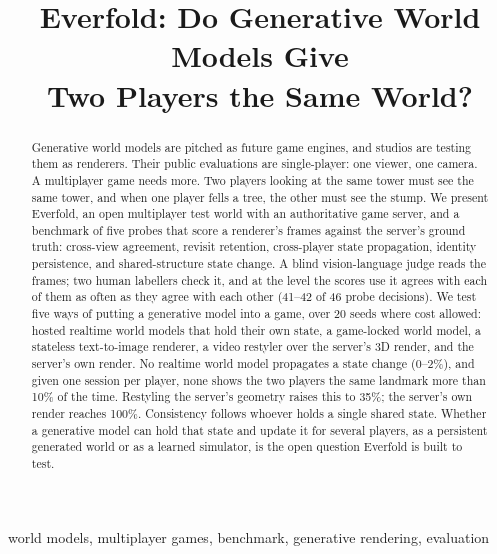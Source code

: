 \documentclass[conference]{IEEEtran}
\begin{document}
\title{Everfold: Do Generative World Models Give\\Two Players the Same World?}

\author{
}

\maketitle

\begin{abstract}
Generative world models are pitched as future game engines, and studios are testing them as renderers. Their public evaluations are single-player: one viewer, one camera. A multiplayer game needs more. Two players looking at the same tower must see the same tower, and when one player fells a tree, the other must see the stump. We present Everfold, an open multiplayer test world with an authoritative game server, and a benchmark of five probes that score a renderer's frames against the server's ground truth: cross-view agreement, revisit retention, cross-player state propagation, identity persistence, and shared-structure state change. A blind vision-language judge reads the frames; two human labellers check it, and at the level the scores use it agrees with each of them as often as they agree with each other (41--42 of 46 probe decisions). We test five ways of putting a generative model into a game, over 20 seeds where cost allowed: hosted realtime world models that hold their own state, a game-locked world model, a stateless text-to-image renderer, a video restyler over the server's 3D render, and the server's own render. No realtime world model propagates a state change (0--2\%), and given one session per player, none shows the two players the same landmark more than 10\% of the time. Restyling the server's geometry raises this to 35\%; the server's own render reaches 100\%. Consistency follows whoever holds a single shared state. Whether a generative model can hold that state and update it for several players, as a persistent generated world or as a learned simulator, is the open question Everfold is built to test.
\end{abstract}

\begin{IEEEkeywords}
world models, multiplayer games, benchmark, generative rendering, evaluation
\end{IEEEkeywords}
\end{document}
